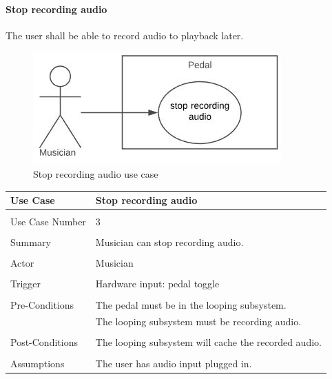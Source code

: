  
        \paragraph{Stop recording audio} 
            The user shall be able to record audio to playback later.
            \begin{figure}[!ht]
                \centering
                \includegraphics[width=.5\textwidth]{diagrams/use_cases/uc-record-stop.JPG}
                \caption{Stop recording audio use case}
                \label{fig:uc-record-stop }
            \end{figure}
            
            \clearpage
            
            \begin{table}[!ht]
                \centering
                \begin{tabular}{ l  l }
                    Use Case & Stop recording audio  \\
                    \hline \\
                    Use Case Number & 3 \\ \\
                    Summary & Musician can stop recording audio. \\ \\
                    Actor & Musician \\ \\
                    Trigger & Hardware input: pedal toggle \\ \\
                    Pre-Conditions & The pedal must be in the looping subsystem. \\
                    & The looping subsystem must be recording audio. \\ \\
                    Post-Conditions & The looping subsystem will cache the recorded audio. \\ \\
                    Assumptions & The user has audio input plugged in.\\ 
                \end{tabular}
            \end{table}
 
